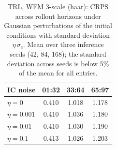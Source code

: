 \begin{table}[ht]
\centering
\caption{TRL, WFM 3-scale (haar): CRPS across rollout horizons under Gaussian perturbations of the initial conditions with standard deviation $\eta\,\sigma_c$. Mean over three inference seeds (42, 84, 168); the standard deviation across seeds is below 5\% of the mean for all entries.}
\label{tab:ic_pert_crps}
\begin{tabular}{lccc}
\toprule
IC noise & 01:32 & 33:64 & 65:97 \\
\midrule
$\eta=0$ & 0.410 & 1.018 & 1.178 \\
$\eta=0.001$ & 0.410 & 1.036 & 1.180 \\
$\eta=0.01$ & 0.410 & 1.030 & 1.190 \\
$\eta=0.1$ & 0.413 & 1.026 & 1.203 \\
\bottomrule
\end{tabular}
\end{table}
